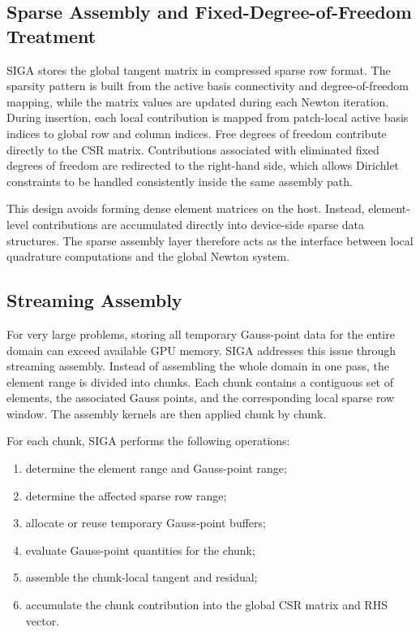 \documentclass[11pt]{article}
\begin{document}
\subsection{Sparse Assembly and Fixed-Degree-of-Freedom Treatment}

SIGA stores the global tangent matrix in compressed sparse row format. The sparsity pattern is built from the active basis connectivity and degree-of-freedom mapping, while the matrix values are updated during each Newton iteration. During insertion, each local contribution is mapped from patch-local active basis indices to global row and column indices. Free degrees of freedom contribute directly to the CSR matrix. Contributions associated with eliminated fixed degrees of freedom are redirected to the right-hand side, which allows Dirichlet constraints to be handled consistently inside the same assembly path.

This design avoids forming dense element matrices on the host. Instead, element-level contributions are accumulated directly into device-side sparse data structures. The sparse assembly layer therefore acts as the interface between local quadrature computations and the global Newton system.

\subsection{Streaming Assembly}

For very large problems, storing all temporary Gauss-point data for the entire domain can exceed available GPU memory. SIGA addresses this issue through streaming assembly. Instead of assembling the whole domain in one pass, the element range is divided into chunks. Each chunk contains a contiguous set of elements, the associated Gauss points, and the corresponding local sparse row window. The assembly kernels are then applied chunk by chunk.

For each chunk, SIGA performs the following operations:
\begin{enumerate}
    \item determine the element range and Gauss-point range;
    \item determine the affected sparse row range;
    \item allocate or reuse temporary Gauss-point buffers;
    \item evaluate Gauss-point quantities for the chunk;
    \item assemble the chunk-local tangent and residual;
    \item accumulate the chunk contribution into the global CSR matrix and RHS vector.
\end{enumerate}
\end{document}
